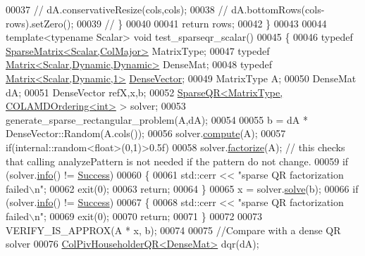 \begin{DoxyCode}
00037 \textcolor{comment}{//     dA.conservativeResize(cols,cols);}
00038 \textcolor{comment}{//     dA.bottomRows(cols-rows).setZero();}
00039 \textcolor{comment}{//   \}}
00040   
00041   \textcolor{keywordflow}{return} rows;
00042 \}
00043 
00044 \textcolor{keyword}{template}<\textcolor{keyword}{typename} Scalar> \textcolor{keywordtype}{void} test\_sparseqr\_scalar()
00045 \{
00046   \textcolor{keyword}{typedef} \hyperlink{group___sparse_core___module}{SparseMatrix<Scalar,ColMajor>} MatrixType; 
00047   \textcolor{keyword}{typedef} \hyperlink{group___core___module}{Matrix<Scalar,Dynamic,Dynamic>} DenseMat;
00048   \textcolor{keyword}{typedef} \hyperlink{group___core___module}{Matrix<Scalar,Dynamic,1>} \hyperlink{group___core___module}{DenseVector};
00049   MatrixType A;
00050   DenseMat dA;
00051   DenseVector refX,x,b; 
00052   \hyperlink{group___sparse_q_r___module_class_eigen_1_1_sparse_q_r}{SparseQR<MatrixType, COLAMDOrdering<int>} > solver; 
00053   generate\_sparse\_rectangular\_problem(A,dA);
00054   
00055   b = dA * DenseVector::Random(A.cols());
00056   solver.\hyperlink{group___sparse_q_r___module_aedaf52b7543de4d55c58c8f830c2aeb7}{compute}(A);
00057   \textcolor{keywordflow}{if}(internal::random<float>(0,1)>0.5f)
00058     solver.\hyperlink{group___sparse_q_r___module_a55a34bacf05bd30a1dacbccad9f03c6d}{factorize}(A);  \textcolor{comment}{// this checks that calling analyzePattern is not needed if the pattern
       do not change.}
00059   \textcolor{keywordflow}{if} (solver.\hyperlink{group___sparse_q_r___module_a234b0580aaf57237393f2e73a3d38690}{info}() != \hyperlink{group__enums_gga85fad7b87587764e5cf6b513a9e0ee5ea52581b035f4b59c203b8ff999ef5fcea}{Success})
00060   \{
00061     std::cerr << \textcolor{stringliteral}{"sparse QR factorization failed\(\backslash\)n"};
00062     exit(0);
00063     \textcolor{keywordflow}{return};
00064   \}
00065   x = solver.\hyperlink{group___sparse_q_r___module_aea13a2c6823cd8408ba49afde9b3d4e4}{solve}(b);
00066   \textcolor{keywordflow}{if} (solver.\hyperlink{group___sparse_q_r___module_a234b0580aaf57237393f2e73a3d38690}{info}() != \hyperlink{group__enums_gga85fad7b87587764e5cf6b513a9e0ee5ea52581b035f4b59c203b8ff999ef5fcea}{Success})
00067   \{
00068     std::cerr << \textcolor{stringliteral}{"sparse QR factorization failed\(\backslash\)n"};
00069     exit(0);
00070     \textcolor{keywordflow}{return};
00071   \}
00072   
00073   VERIFY\_IS\_APPROX(A * x, b);
00074   
00075   \textcolor{comment}{//Compare with a dense QR solver}
00076   \hyperlink{group___q_r___module_class_eigen_1_1_col_piv_householder_q_r}{ColPivHouseholderQR<DenseMat>} dqr(dA);

\end{DoxyCode}
